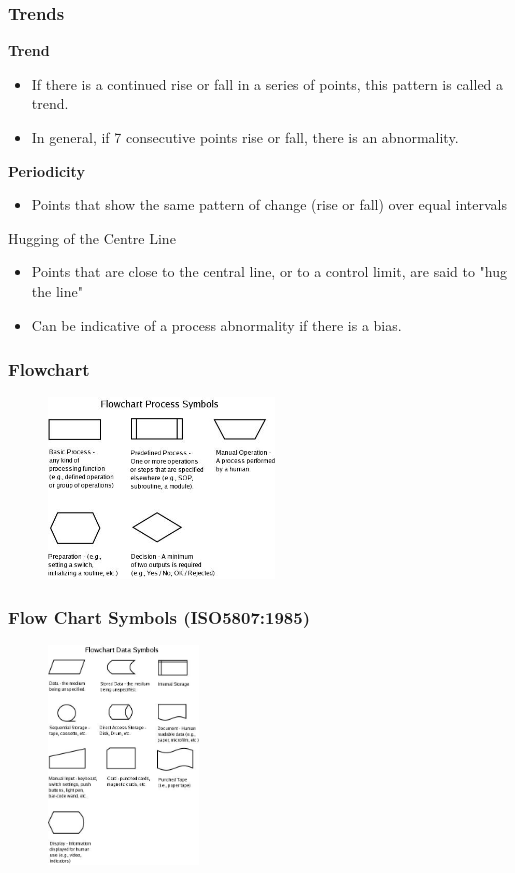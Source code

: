 \begin{frame}
\frametitle{Trends}
\textbf{Trend}
\begin{itemize}
	\item If there is a continued rise or fall in a series of points, this pattern is called a trend.
	\item In general, if 7 consecutive points rise or fall, there is an abnormality.
\end{itemize}
\textbf{Periodicity}
\begin{itemize}
	\item Points that show the same pattern of change (rise or fall) over equal intervals
\end{itemize}
Hugging of the Centre Line
\begin{itemize}
	\item Points that are close to the central line, or to a control limit, are said to "hug the line"
	\item Can be indicative of a process abnormality if there is a bias.
\end{itemize}
\end{frame}




\begin{frame}
\frametitle{Flowchart}
\begin{figure}
	\centering
		\includegraphics[width = 6cm]{images/flow1.jpg}
	\label{fig:flow1}
\end{figure}
\end{frame}




\begin{frame}
\frametitle{Flow Chart Symbols  (ISO5807:1985) }
\begin{figure}
	\centering
		\includegraphics[width = 4cm]{images/flow2.jpg}
	\label{fig:flow2}
\end{figure}

\end{frame}




